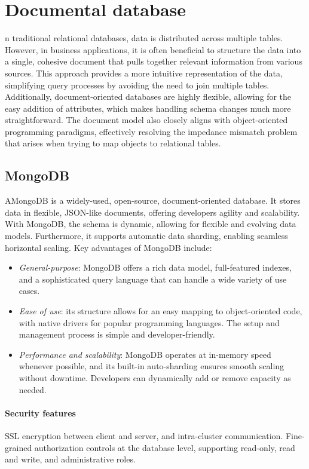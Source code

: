 \section{Documental database}

n traditional relational databases, data is distributed across multiple tables. 
However, in business applications, it is often beneficial to structure the data into a single, cohesive document that pulls together relevant information from various sources. 
This approach provides a more intuitive representation of the data, simplifying query processes by avoiding the need to join multiple tables. 
Additionally, document-oriented databases are highly flexible, allowing for the easy addition of attributes, which makes handling schema changes much more straightforward. 
The document model also closely aligns with object-oriented programming paradigms, effectively resolving the impedance mismatch problem that arises when trying to map objects to relational tables.

\subsection{MongoDB}
AMongoDB is a widely-used, open-source, document-oriented database. 
It stores data in flexible, JSON-like documents, offering developers agility and scalability. With MongoDB, the schema is dynamic, allowing for flexible and evolving data models. 
Furthermore, it supports automatic data sharding, enabling seamless horizontal scaling.
Key advantages of MongoDB include: 
\begin{itemize} 
    \item \textit{General-purpose}: MongoDB offers a rich data model, full-featured indexes, and a sophisticated query language that can handle a wide variety of use cases. 
    \item \textit{Ease of use}: its structure allows for an easy mapping to object-oriented code, with native drivers for popular programming languages. 
        The setup and management process is simple and developer-friendly. 
    \item \textit{Performance and scalability}: MongoDB operates at in-memory speed whenever possible, and its built-in auto-sharding ensures smooth scaling without downtime. 
        Developers can dynamically add or remove capacity as needed. 
\end{itemize}

\paragraph*{Security features} 
SSL encryption between client and server, and intra-cluster communication. 
Fine-grained authorization controls at the database level, supporting read-only, read and write, and administrative roles.

